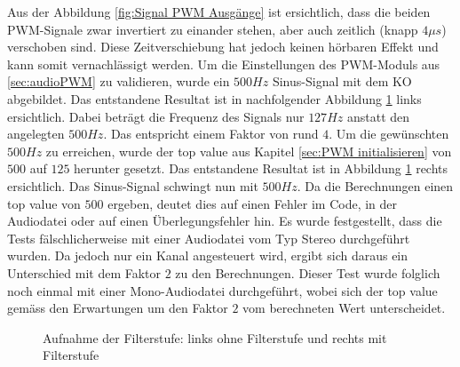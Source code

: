 Aus der Abbildung \ref{fig:Signal PWM Ausgänge} ist ersichtlich, dass die beiden PWM-Signale zwar invertiert zu einander stehen, aber auch zeitlich (knapp $4\mu s$) verschoben sind. Diese Zeitverschiebung hat jedoch keinen hörbaren Effekt und kann somit vernachlässigt werden. Um die Einstellungen des PWM-Moduls aus \ref{sec:audioPWM} zu validieren, wurde ein $500Hz$ Sinus-Signal mit dem KO abgebildet. Das entstandene Resultat ist in nachfolgender Abbildung \ref{fig:PWM Topval 500 Stereo} links ersichtlich. Dabei beträgt die Frequenz des Signals nur $127Hz$ anstatt den angelegten $500Hz$. Das entspricht einem Faktor von rund $4$. Um die gewünschten $500Hz$ zu erreichen, wurde der top value aus Kapitel \ref{sec:PWM initialisieren} von $500$ auf $125$ herunter gesetzt. Das entstandene Resultat ist in Abbildung \ref{fig:PWM Topval 500 Stereo} rechts ersichtlich. Das Sinus-Signal schwingt nun mit $500Hz$. Da die Berechnungen einen top value von $500$ ergeben, deutet dies auf einen Fehler im Code, in der Audiodatei oder auf einen Überlegungsfehler hin. Es wurde festgestellt, dass die Tests fälschlicherweise mit einer Audiodatei vom Typ Stereo durchgeführt wurden. Da jedoch nur ein Kanal angesteuert wird, ergibt sich daraus ein Unterschied mit dem Faktor $2$ zu den Berechnungen. Dieser Test wurde folglich noch einmal mit einer Mono-Audiodatei durchgeführt, wobei sich der top value gemäss den Erwartungen um den Faktor $2$ vom berechneten Wert unterscheidet.

\begin{figure}[htbp]
	\centering
	\quad
	\quad
	\caption[PWM auf $128kHz$ eingestellt]{Aufnahme der Filterstufe: links ohne Filterstufe und rechts mit Filterstufe}
	\label{fig:PWM Topval 500 Stereo}
\end{figure}

